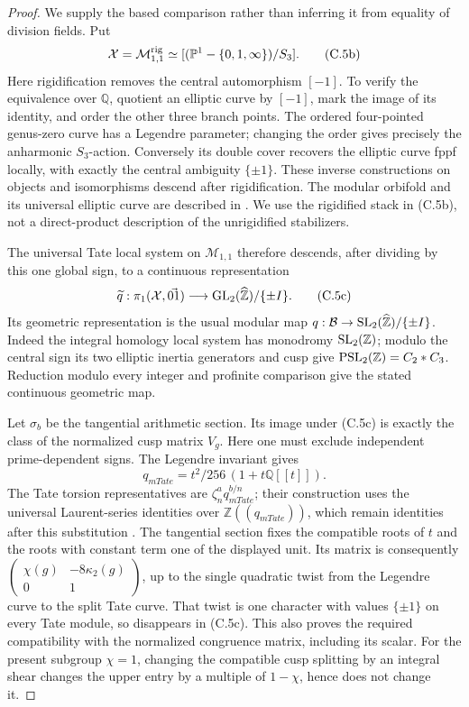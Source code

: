 \begin{proof}
We supply the based comparison rather than inferring it
from equality of division fields. Put
\[
 \mathcal X=\mathcal M_{1,1}^{\rm rig}
       \simeq[(\mathbb P^1-\{0,1,\infty\})/S_3].
 \tag{C.5b}
\]
Here rigidification removes the central automorphism
\([-1]\). To verify the equivalence over \(\mathbb Q\),
quotient an elliptic curve by \([-1]\), mark the image
of its identity, and order the other three branch points.
The ordered four-pointed genus-zero curve has a Legendre
parameter; changing the order gives precisely the
anharmonic \(S_3\)-action. Conversely its double cover
recovers the elliptic curve fppf locally, with exactly
the central ambiguity \(\{\pm1\}\). These inverse
constructions on objects and isomorphisms descend after
rigidification. The modular orbifold and its universal
elliptic curve are described in
\citet[Example 3.14, \S3.6 and \S8.4]{cHain2010}.
We use the rigidified stack in (C.5b), not a direct-product
description of the unrigidified stabilizers.

The universal Tate local system on \(\mathcal M_{1,1}\)
therefore descends, after dividing by this one global
sign, to a continuous representation
\[
 \widetilde q:\pi_1(\mathcal X,\vec{01})
    \longrightarrow
       {\rm GL}_2(\widehat{\mathbb Z})/\{\pm I\}.
 \tag{C.5c}
\]
Its geometric representation is the usual modular map
\(q:\mathcal B\to{\rm SL}_2(\widehat{\mathbb Z})/\{\pm I\}\).
Indeed the integral homology local system has monodromy
\({\rm SL}_2(\mathbb Z)\); modulo the central sign its
two elliptic inertia generators and cusp give
\({\rm PSL}_2(\mathbb Z)=C_2*C_3\).
Reduction modulo every integer and profinite comparison
give the stated continuous geometric map.

Let \(\sigma_b\) be the tangential arithmetic section.
Its image under (C.5c) is exactly the class of the
normalized cusp matrix \(V_g\). Here one must exclude
independent prime-dependent signs. The Legendre invariant
gives
\[
 q_{
m Tate}=t^2/256\,(1+t\mathbb Q[[t]]).
 \tag{C.5d}
\]
The Tate torsion representatives are
\(\zeta_n^a q_{
m Tate}^{b/n}\); their construction
uses the universal Laurent-series identities over
\(\mathbb Z((q_{
m Tate}))\), which remain identities
after this substitution
\citep[III, pp.~102--103, equations (23)--(26)]{cMilne2021}.
The tangential section fixes the compatible roots of
\(t\) and the roots with constant term one of the
displayed unit. Its matrix is consequently
\(\left(\begin{smallmatrix}\chi(g)&-8\kappa_2(g)\\0&1
\end{smallmatrix}\right)\), up to the single quadratic
twist from the Legendre curve to the split Tate curve.
That twist is one character with values \(\{\pm1\}\)
on every Tate module, so disappears in (C.5c).
This also proves the required compatibility with the
normalized congruence matrix, including its scalar.
For the present subgroup \(\chi=1\), changing the
compatible cusp splitting by an integral shear changes
the upper entry by a multiple of \(1-\chi\), hence
does not change it.


\end{proof}
